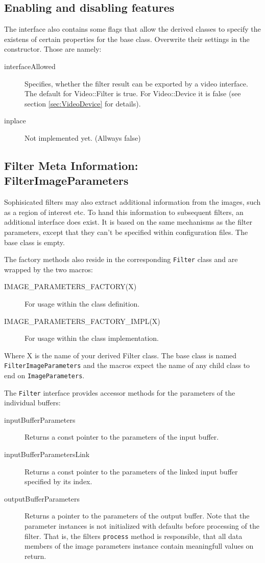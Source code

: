 \subsection{Enabling and disabling features}

The interface also contains some flags that allow the
derived classes to specify the existens of certain properties for the
base class. Overwrite their settings in the constructor. Those are namely:
\begin{description}
\item[interfaceAllowed] Specifies, whether the filter result can be
  exported by a video interface. The default for Video::Filter is
  true. For Video::Device it is false (see section
  \ref{sec:VideoDevice} for details).
\item[inplace] Not implemented yet. (Allways false)
\end{description}

\subsection{Filter Meta Information: FilterImageParameters}

Sophisicated filters may also extract additional information from the
images, such as a region of interest etc. To hand this information to
subsequent filters, an additional interface does exist. It is based on
the same mechanisms as the filter parameters, except that they can't
be specified within configuration files. The base class is empty.

The factory methods also reside in the corresponding {\tt Filter}
class and are wrapped by the two macros:
\begin{description}
\item[IMAGE\_PARAMETERS\_FACTORY(X)] For usage within the class definition.
\item[IMAGE\_PARAMETERS\_FACTORY\_IMPL(X)] For usage within the class implementation.
\end{description}
Where X is the name of your derived Filter class. The base class is
named {\tt FilterImageParameters} and the macros expect the name of
any child class to end on {\tt ImageParameters}.

The {\tt Filter} interface provides accessor methods for the
parameters of the individual buffers:
\begin{description}
\item[inputBufferParameters] Returns a const pointer to the parameters
  of the input buffer.
\item[inputBufferParametersLink] Returns a const pointer to the
  parameters of the linked input buffer specified by its index.
\item[outputBufferParameters] Returns a pointer to the parameters of
  the output buffer. Note that the parameter instances is not
  initialized with defaults before processing of the filter. That is,
  the filters {\tt process} method is responsible, that all data
  members of the image parameters instance contain meaningfull values
  on return.
\end{description}


